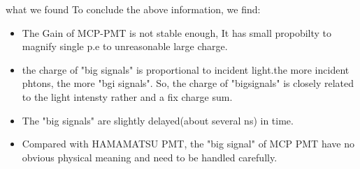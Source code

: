 \documentclass[11pt,compress,xcolor=x11names,UTF8]{beamer}
\begin{document}
\begin{frame}{what we found}
To conclude  the above information, we find:
	\begin{itemize}
		\item \alert{The Gain of MCP-PMT is not stable enough}, It has small propobilty to magnify single p.e to unreasonable large charge. 
		\item \alert{the charge of "big signals" is proportional to incident light.}the more incident phtons, the more "bgi signals". So, the charge of "bigsignals" is closely related to the light intensty rather and a fix charge sum.
		\item The "big signals" are slightly \alert{delayed(about several ns) in time.}
		\item Compared with HAMAMATSU PMT, the "big signal" of MCP PMT have no obvious physical meaning and need to be handled carefully. 
	\end{itemize}
\end{frame}
\end{document}
